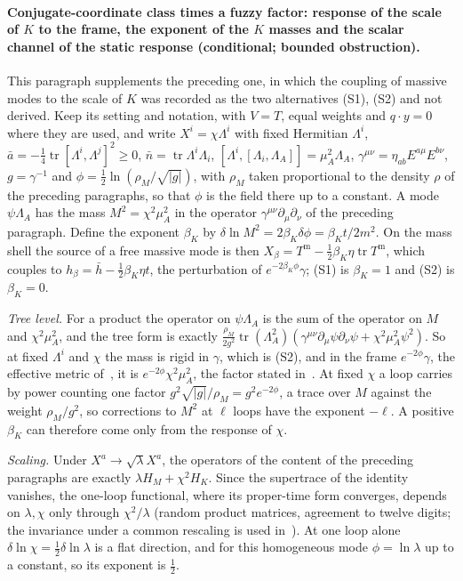 \paragraph{Conjugate-coordinate class times a fuzzy factor: response of the scale of \(K\) to the frame, the exponent of the \(K\) masses and the scalar channel of the static response (conditional; bounded obstruction).}
This paragraph supplements the preceding one, in which the coupling of massive modes to the scale of \(K\) was recorded as the two alternatives (S1), (S2) and not derived. Keep its setting and notation, with \(V=T\), equal weights and \(q\cdot y=0\) where they are used, and write \(X^i=\chi\Lambda^i\) with fixed Hermitian \(\Lambda^i\), \(\bar a=-\tfrac14\operatorname{tr}[\Lambda^i,\Lambda^j]^2\ge0\), \(\bar n=\operatorname{tr}\Lambda^i\Lambda_i\), \([\Lambda^i,[\Lambda_i,\Lambda_A]]=\mu_A^2\Lambda_A\), \(\gamma^{\mu\nu}=\eta_{ab}E^{a\mu}E^{b\nu}\), \(g=\gamma^{-1}\) and \(\phi=\tfrac12\ln(\rho_M/\sqrt{|g|})\), with \(\rho_M\) taken proportional to the density \(\rho\) of the preceding paragraphs, so that \(\phi\) is the field there up to a constant. A mode \(\psi\Lambda_A\) has the mass \(M^2=\chi^2\mu_A^2\) in the operator \(\gamma^{\mu\nu}\partial_\mu\partial_\nu\) of the preceding paragraph. Define the exponent \(\beta_K\) by \(\delta\ln M^2=2\beta_K\delta\phi=\beta_Kt/2m^2\). On the mass shell the source of a free massive mode is then \(X_\beta=T^{\mathrm m}-\tfrac12\beta_K\eta\operatorname{tr}T^{\mathrm m}\), which couples to \(h_\beta=\bar h-\tfrac12\beta_K\eta t\), the perturbation of \(e^{-2\beta_K\phi}\gamma\); (S1) is \(\beta_K=1\) and (S2) is \(\beta_K=0\).

\emph{Tree level.} For a product the operator on \(\psi\Lambda_A\) is the sum of the operator on \(M\) and \(\chi^2\mu_A^2\), and the tree form is exactly \(\tfrac{\rho_M}{2g^2}\operatorname{tr}(\Lambda_A^2)(\gamma^{\mu\nu}\partial_\mu\psi\partial_\nu\psi+\chi^2\mu_A^2\psi^2)\). So at fixed \(\Lambda^i\) and \(\chi\) the mass is rigid in \(\gamma\), which is (S2), and in the frame \(e^{-2\phi}\gamma\), the effective metric of~\cite{Steinacker2026}, it is \(e^{-2\phi}\chi^2\mu_A^2\), the factor stated in~\cite{MantaSteinacker2025b}. At fixed \(\chi\) a loop carries by power counting one factor \(g^2\sqrt{|g|}/\rho_M=g^2e^{-2\phi}\), a trace over \(M\) against the weight \(\rho_M/g^2\), so corrections to \(M^2\) at \(\ell\) loops have the exponent \(-\ell\). A positive \(\beta_K\) can therefore come only from the response of \(\chi\).

\emph{Scaling.} Under \(X^a\to\sqrt\lambda X^a\), the operators of the content of the preceding paragraphs are exactly \(\lambda H_M+\chi^2H_K\). Since the supertrace of the identity vanishes, the one-loop functional, where its proper-time form converges, depends on \(\lambda,\chi\) only through \(\chi^2/\lambda\) (random product matrices, agreement to twelve digits; the invariance under a common rescaling is used in~\cite{MantaSteinacker2025b}). At one loop alone \(\delta\ln\chi=\tfrac12\delta\ln\lambda\) is a flat direction, and for this homogeneous mode \(\phi=\ln\lambda\) up to a constant, so its exponent is \(\tfrac12\).

